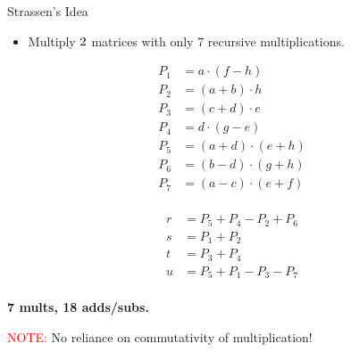 \documentclass{beamer}
\newcommand{\toRight}[1]{
    \begin{FlushRight}
        {\small #1}
    \end{FlushRight}
} %
\begin{document}
\begin{frame}{Strassen's Idea}
    \begin{itemize}
        \item Multiply $2 \time 2$ matrices with only 7 recursive multiplications.
    \end{itemize}
    \begin{minipage}{0.48\textwidth}
        \begin{equation*}
            \begin{split}
                P_1 &= a \cdot (f - h) \\
                P_2 &= (a + b) \cdot h \\
                P_3 &= (c + d) \cdot e \\
                P_4 &= d \cdot (g - e) \\
                P_5 &= (a + d) \cdot (e + h) \\
                P_6 &= (b - d) \cdot (g + h) \\
                P_7 &= (a - c) \cdot (e + f) \\
            \end{split}
        \end{equation*}
    \end{minipage} %
    \hfill
    \begin{minipage}{0.48\textwidth}
        \begin{equation*}
            \begin{split}
                r &= P_5 + P_4 - P_2 + P_6 \\
                s &= P_1 + P_2 \\
                t &= P_3 + P_4 \\
                u &= P_5 + P_1 - P_3 - P_7 \\
            \end{split}
        \end{equation*}
    \end{minipage}
    \toRight{\textbf{7 mults, 18 adds/subs.}}
    \begin{alertblock}{\textcolor{red}{NOTE:}}
        No reliance on commutativity of multiplication!
    \end{alertblock}
\end{frame}
\end{document}
